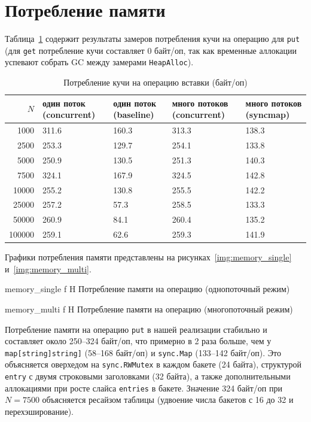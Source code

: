 \documentclass{itmo}
\begin{document}
\section{Потребление памяти}

Таблица~\ref{tab:memory} содержит результаты замеров потребления кучи на операцию для \texttt{put} (для \texttt{get} потребление кучи составляет 0 байт/оп, так как временные аллокации успевают собрать GC между замерами \texttt{HeapAlloc}).

\begin{table}[H]
	\centering
	\caption{Потребление кучи на операцию вставки (байт/оп)}
	\label{tab:memory}
	\begin{tabularx}{\textwidth}{|r|X|X|X|X|}
		\toprule
		$N$ & один поток (concurrent) & один поток (baseline) & много потоков (concurrent) & много потоков (syncmap) \\
		\midrule
		1000 & 311.6 & 160.3 & 313.3 & 138.3 \\
		2500 & 253.3 & 129.7 & 254.1 & 133.8 \\
		5000 & 250.9 & 130.5 & 251.3 & 140.3 \\
		7500 & 324.1 & 167.9 & 324.5 & 142.8 \\
		10000 & 255.2 & 130.8 & 255.5 & 142.2 \\
		25000 & 257.2 & 57.3 & 258.5 & 133.3 \\
		50000 & 260.9 & 84.1 & 260.4 & 135.2 \\
		100000 & 259.1 & 62.6 & 259.3 & 141.9 \\
		\bottomrule
	\end{tabularx}
\end{table}

Графики потребления памяти представлены на рисунках~\ref{img:memory_single} и~\ref{img:memory_multi}.

	{memory_single}
	{f}
	{H}
	{\textwidth}
	{Потребление памяти на операцию (однопоточный режим)}

	{memory_multi}
	{f}
	{H}
	{\textwidth}
	{Потребление памяти на операцию (многопоточный режим)}

Потребление памяти на операцию \texttt{put} в нашей реализации стабильно и составляет около 250--324 байт/оп, что примерно в 2 раза больше, чем у \texttt{map[string]string]} (58--168 байт/оп) и \texttt{sync.Map} (133--142 байт/оп).
Это объясняется оверхедом на \texttt{sync.RWMutex} в каждом бакете (24 байта), структурой \texttt{entry} с двумя строковыми заголовками (32 байта), а также дополнительными аллокациями при росте слайса \texttt{entries} в бакете.
Значение 324 байт/оп при $N = 7500$ объясняется ресайзом таблицы (удвоение числа бакетов с 16 до 32 и перехэширование).
\end{document}
